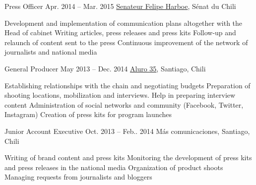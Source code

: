 \begin{joblist}[13.2][7.8][3.4]
\item[Press Officer]{Apr. 2014 -- Mar. 2015}
     {
     \href{https://www.harboe.cl/}{Senateur Felipe Harboe}, Sénat du Chili
     } 
	 {
	         \vspace{-0.5cm}
			\iftbftiny \setlength{\parskip}{-10pt} \fi
			\begin{itemize}
			  \iftbftiny \setlength\itemsep{-3pt} \fi
			  \cvitem[\checkmark] Development and implementation of communication plans altogether with the Head of cabinet
			  \cvitem[\checkmark] Writing articles, press releases and press kits
			  \cvitem[\checkmark] Follow-up and relaunch of content sent to the press
			  \cvitem[\checkmark] Continuous improvement of the network of journalists and national media
			\end{itemize}     
	}
    
        
\item[General Producer]{May 2013 -- Dec. 2014}
     {
     \href{https://www.aluro35.com/}{Aluro 35}, Santiago, Chili
     }
     {	
             \vspace{-0.5cm}
			\iftbftiny \setlength{\parskip}{-10pt} \fi
			\begin{itemize}
			  \iftbftiny \setlength\itemsep{-3pt} \fi
			  \cvitem[\checkmark] Establishing relationships with the chain and negotiating budgets
			  \cvitem[\checkmark] Preparation of shooting locations, mobilization and interviews. Help in preparing interview content
			  \cvitem[\checkmark] Administration of social networks and community (Facebook, Twitter, Instagram)
			  \cvitem[\checkmark] Creation of press kits for program launches
			\end{itemize}     
	}



\item[Junior Account Executive ]{Oct. 2013 -- Feb.. 2014 }     
  	{
  	Más comunicaciones, Santiago, Chili
  	}     
  	{
        \vspace{-0.5cm}
		\iftbftiny \setlength{\parskip}{-10pt} \fi
		\begin{itemize}
			  \iftbftiny \setlength\itemsep{-3pt} \fi
			  \cvitem[\checkmark] Writing of brand content and press kits
			  \cvitem[\checkmark] Monitoring the development of press kits and press releases in the national media
			  \cvitem[\checkmark] Organization of product shoots
			  \cvitem[\checkmark] Managing requests from journalists and bloggers
		\end{itemize}       
	}





\end{joblist}
